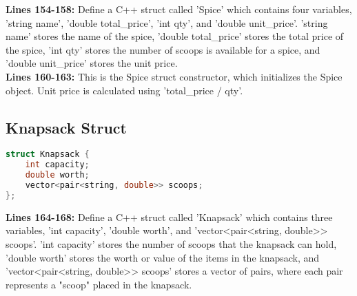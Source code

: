 \documentclass[letterpaper, 10pt,DIV=13]{scrartcl}
\numberwithin{equation}{section} %
\numberwithin{figure}{section} %
\numberwithin{table}{section} %
\begin{document}
\textbf{Lines 154-158:} Define a C++ struct called 'Spice' which contains four variables, 'string name', 'double total_price', 'int qty', and 'double unit_price'.  'string name' stores the name of the spice, 'double total_price' stores the total price of the spice, 'int qty' stores the number of scoops is available for a spice, and 'double unit_price' stores the unit price.\\
\textbf{Lines 160-163:} This is the Spice struct constructor, which initializes the Spice object. Unit price is calculated using 'total_price / qty'.

\subsection{Knapsack Struct}
\begin{linenumbers}
\begin{lstlisting}[language=C++, caption={Knapsack Struct}, label={code:example}]
struct Knapsack {
    int capacity;
    double worth;
    vector<pair<string, double>> scoops;
};
\end{lstlisting}
\end{linenumbers}
\nolinenumbers

\textbf{Lines 164-168:} Define a C++ struct called 'Knapsack' which contains three variables, 'int capacity', 'double worth', and 'vector<pair<string, double>> scoops'. 'int capacity' stores the number of scoops that the knapsack can hold, 'double worth' stores the worth or value of the items in the knapsack, and 'vector<pair<string, double>> scoops' stores a vector of pairs, where each pair represents a "scoop" placed in the knapsack. \\
\end{document}
